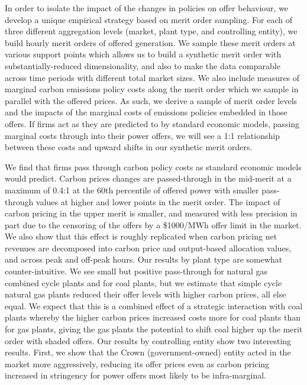 \documentclass[12pt]{article}
\begin{document}
In order to isolate the impact of the changes in policies on offer behaviour, we develop a unique empirical strategy based on merit order sampling. For each of three different aggregation levels (market, plant type, and controlling entity), we build hourly merit orders of offered generation. We sample these merit orders at various support points which allows us to build a synthetic merit order with substantially-reduced dimensionality, and also to make the data comparable across time periods with different total market sizes. We also include measures of marginal carbon emissions policy costs along the merit order which we sample in parallel with the offered prices. As such, we derive a sample of merit order levels and the impacts of the marginal costs of emissions policies embedded in those offers. If firms act as they are predicted to by standard economic models, passing marginal costs through into their power offers, we will see a 1:1 relationship between these costs and upward shifts in our synthetic merit orders.

We find that firms pass through carbon policy costs as standard economic models would predict. Carbon prices changes are passed-through in the mid-merit at a maximum of 0.4:1 at the 60th percentile of offered power with smaller pass-through values at higher and lower points in the merit order. The impact of carbon pricing in the upper merit is smaller, and measured with less precision in part due to the censoring of the offers by a \$1000/MWh offer limit in the market. We also show that this effect is roughly replicated when carbon pricing net revenues are decomposed into carbon price and output-based allocation values, and across peak and off-peak hours. Our results by plant type are somewhat counter-intuitive. We see small but positive pass-through for natural gas combined cycle plants and for coal plants, but we estimate that simple cycle natural gas plants reduced their offer levels with higher carbon prices, all else equal. We expect that this is a combined effect of a strategic interaction with coal plants whereby the higher carbon prices increased costs more for coal plants than for gas plants, giving the gas plants the potential to shift coal higher up the merit order with shaded offers. Our results by controlling entity show two interesting results. First, we show that the Crown (government-owned) entity acted in the market more aggressively, reducing its offer prices even as carbon pricing increased in stringency for power offers most likely to be infra-marginal.
\end{document}
